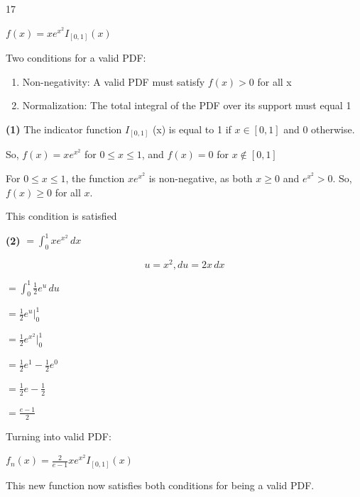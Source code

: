 \documentclass[12 pt]{article}
\begin{document}
    \begin{exercise}{17}
    \hfill

    $f(x) = xe^{x^2} I_{[0, 1]} (x)$

    Two conditions for a valid PDF:
    \begin{enumerate}
        \item Non-negativity: A valid PDF must satisfy $f(x) > 0$ for all x
        \item Normalization: The total integral of the PDF over its support must equal 1
    \end{enumerate}

    \hfill

    \textbf{(1)} The indicator function $I_{[0,1]}$ (x) is equal to 1 if $x \in [0,1]$ and 0 otherwise.

    So, $f(x) = xe^{x^2}$ for $0 \leq x \leq 1$, and $f(x) = 0$ for $x \notin [0, 1]$

    \hfill

    For $0 \leq x \leq 1$, the function $x e^{x^2}$ is non-negative, as both $x \geq 0$ and $e^{x^2} > 0$. So, $f(x) \geq 0$ for all $x$.

    \hfill

    This condition is satisfied

    \textbf{(2)} $= \int_{0}^{1} x e^{x^2} \, dx$

    $$u = x^2, du = 2x \, dx$$

    $= \int_{0}^{1} \frac{1}{2} e^u \, du$

    $= \frac{1}{2} e^u |_{0}^{1}$

    $= \frac{1}{2} e^{x^2} |_{0}^{1}$

    $= \frac{1}{2} e^1 - \frac{1}{2} e^0$

    $= \frac{1}{2} e - \frac{1}{2}$

    $= \frac{e-1}{2}$

    \hfill

    Turning into valid PDF:

    $f_n(x) = \frac{2}{e-1} x e^{x^2} I_{[0, 1]} (x)$

    This new function now satisfies both conditions for being a valid PDF.     
    \end{exercise} 
\end{document}
